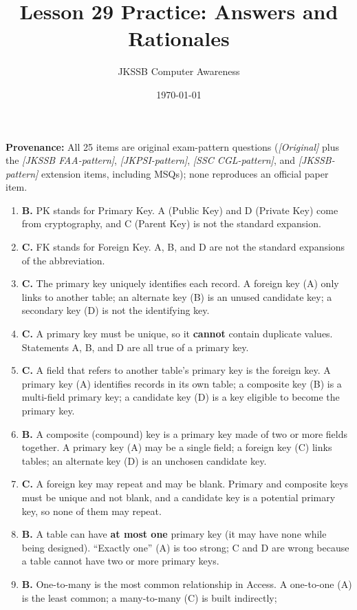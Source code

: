 \documentclass[11pt]{article}
\title{Lesson 29 Practice: Answers and Rationales}
\author{JKSSB Computer Awareness}
\date{\today}
\begin{document}
\maketitle
\noindent\textbf{Provenance:} All 25 items are original exam-pattern questions (\textit{[Original]} plus the \textit{[JKSSB FAA-pattern]}, \textit{[JKPSI-pattern]}, \textit{[SSC CGL-pattern]}, and \textit{[JKSSB-pattern]} extension items, including MSQs); none reproduces an official paper item.
\begin{enumerate}[label=\textbf{Q\arabic*.}, leftmargin=*]
\item \textbf{B.} PK stands for Primary Key. A (Public Key) and D (Private
  Key) come from cryptography, and C (Parent Key) is not the standard
  expansion.
\item \textbf{C.} FK stands for Foreign Key. A, B, and D are not the standard
  expansions of the abbreviation.
\item \textbf{C.} The primary key uniquely identifies each record. A foreign
  key (A) only links to another table; an alternate key (B) is an unused
  candidate key; a secondary key (D) is not the identifying key.
\item \textbf{C.} A primary key must be unique, so it \textbf{cannot} contain
  duplicate values. Statements A, B, and D are all true of a primary key.
\item \textbf{C.} A field that refers to another table's primary key is the
  foreign key. A primary key (A) identifies records in its own table; a
  composite key (B) is a multi-field primary key; a candidate key (D) is a key
  eligible to become the primary key.
\item \textbf{B.} A composite (compound) key is a primary key made of two or
  more fields together. A primary key (A) may be a single field; a foreign key
  (C) links tables; an alternate key (D) is an unchosen candidate key.
\item \textbf{C.} A foreign key may repeat and may be blank. Primary and
  composite keys must be unique and not blank, and a candidate key is a
  potential primary key, so none of them may repeat.
\item \textbf{B.} A table can have \textbf{at most one} primary key (it may
  have none while being designed). ``Exactly one'' (A) is too strong; C and D
  are wrong because a table cannot have two or more primary keys.
\item \textbf{B.} One-to-many is the most common relationship in Access. A
  one-to-one (A) is the least common; a many-to-many (C) is built indirectly;

\end{enumerate}
\end{document}
